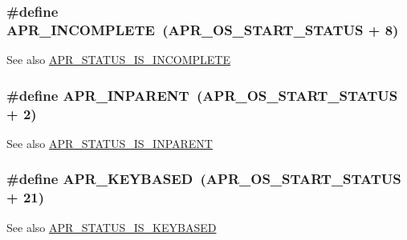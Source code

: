 \subsubsection[{\texorpdfstring{A\+P\+R\+\_\+\+I\+N\+C\+O\+M\+P\+L\+E\+TE}{APR_INCOMPLETE}}]{\setlength{\rightskip}{0pt plus 5cm}\#define A\+P\+R\+\_\+\+I\+N\+C\+O\+M\+P\+L\+E\+TE~({\bf A\+P\+R\+\_\+\+O\+S\+\_\+\+S\+T\+A\+R\+T\+\_\+\+S\+T\+A\+T\+US} + 8)}\hypertarget{group___a_p_r___error_ga64dff43b83bcefd3f3c751be6b864ca1}{}\label{group___a_p_r___error_ga64dff43b83bcefd3f3c751be6b864ca1}
\begin{DoxySeeAlso}{See also}
\hyperlink{group___a_p_r___s_t_a_t_u_s___i_s_ga3924108de51167fb450cf906779a79c5}{A\+P\+R\+\_\+\+S\+T\+A\+T\+U\+S\+\_\+\+I\+S\+\_\+\+I\+N\+C\+O\+M\+P\+L\+E\+TE} 
\end{DoxySeeAlso}
\subsubsection[{\texorpdfstring{A\+P\+R\+\_\+\+I\+N\+P\+A\+R\+E\+NT}{APR_INPARENT}}]{\setlength{\rightskip}{0pt plus 5cm}\#define A\+P\+R\+\_\+\+I\+N\+P\+A\+R\+E\+NT~({\bf A\+P\+R\+\_\+\+O\+S\+\_\+\+S\+T\+A\+R\+T\+\_\+\+S\+T\+A\+T\+US} + 2)}\hypertarget{group___a_p_r___error_ga79abc0fb43e51e0db87f90fa49745d89}{}\label{group___a_p_r___error_ga79abc0fb43e51e0db87f90fa49745d89}
\begin{DoxySeeAlso}{See also}
\hyperlink{group___a_p_r___s_t_a_t_u_s___i_s_ga6a8b21a7726a7907e7271525d4deabd9}{A\+P\+R\+\_\+\+S\+T\+A\+T\+U\+S\+\_\+\+I\+S\+\_\+\+I\+N\+P\+A\+R\+E\+NT} 
\end{DoxySeeAlso}
\subsubsection[{\texorpdfstring{A\+P\+R\+\_\+\+K\+E\+Y\+B\+A\+S\+ED}{APR_KEYBASED}}]{\setlength{\rightskip}{0pt plus 5cm}\#define A\+P\+R\+\_\+\+K\+E\+Y\+B\+A\+S\+ED~({\bf A\+P\+R\+\_\+\+O\+S\+\_\+\+S\+T\+A\+R\+T\+\_\+\+S\+T\+A\+T\+US} + 21)}\hypertarget{group___a_p_r___error_gaac52bebace264494fa94cdf0b4344d26}{}\label{group___a_p_r___error_gaac52bebace264494fa94cdf0b4344d26}
\begin{DoxySeeAlso}{See also}
\hyperlink{group___a_p_r___s_t_a_t_u_s___i_s_ga02052b8fb7367a4c27a88400023941a7}{A\+P\+R\+\_\+\+S\+T\+A\+T\+U\+S\+\_\+\+I\+S\+\_\+\+K\+E\+Y\+B\+A\+S\+ED} 
\end{DoxySeeAlso}
